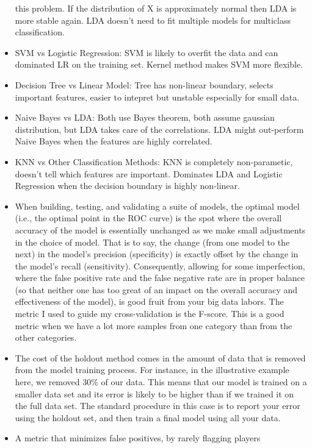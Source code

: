 \documentclass[]{book}
\theoremstyle{definition}
\theoremstyle{definition}
\theoremstyle{definition}
\theoremstyle{remark}
\begin{document}
\begin{itemize}
  this problem. If the distribution of X is approximately normal then
  LDA is more stable again. LDA doesn't need to fit multiple models for
  multiclass classification.
\item
  SVM vs Logistic Regression: SVM is likely to overfit the data and can
  dominated LR on the training set. Kernel method makes SVM more
  flexible.
\item
  Decision Tree vs Linear Model: Tree has non-linear boundary, selects
  important features, easier to intepret but unstable especially for
  small data.
\item
  Naive Bayes vs LDA: Both use Bayes theorem, both assume gaussian
  distribution, but LDA takes care of the correlations. LDA might
  out-perform Naive Bayes when the features are highly correlated.
\item
  KNN vs Other Classification Methods: KNN is completely non-parametic,
  doesn't tell which features are important. Dominates LDA and Logistic
  Regression when the decision boundary is highly non-linear.
\item
  When building, testing, and validating a suite of models, the optimal
  model (i.e., the optimal point in the ROC curve) is the spot where the
  overall accuracy of the model is essentially unchanged as we make
  small adjustments in the choice of model. That is to say, the change
  (from one model to the next) in the model's precision (specificity) is
  exactly offset by the change in the model's recall (sensitivity).
  Consequently, allowing for some imperfection, where the false positive
  rate and the false negative rate are in proper balance (so that
  neither one has too great of an impact on the overall accuracy and
  effectiveness of the model), is good fruit from your big data labors.
  The metric I used to guide my cross-validation is the F-score. This is
  a good metric when we have a lot more samples from one category than
  from the other categories.
\item
  The cost of the holdout method comes in the amount of data that is
  removed from the model training process. For instance, in the
  illustrative example here, we removed 30\% of our data. This means
  that our model is trained on a smaller data set and its error is
  likely to be higher than if we trained it on the full data set. The
  standard procedure in this case is to report your error using the
  holdout set, and then train a final model using all your data.
\item
  A metric that minimizes false positives, by rarely flagging players

\end{itemize}
\end{document}
